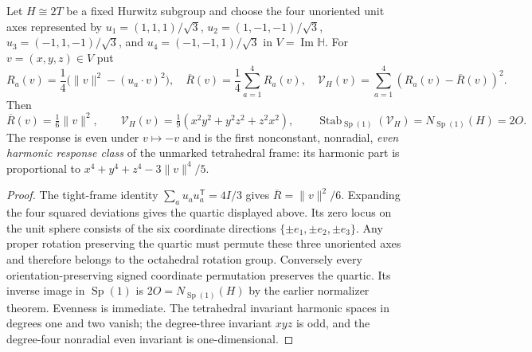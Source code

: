\documentclass[11pt]{article}
\begin{document}
\begin{theorem}
\label{p1b:thm:v18-born-even-octahedral-response}
Let $H\cong2T$ be a fixed Hurwitz subgroup and choose the four
unoriented unit axes represented by
$u_1=(1,1,1)/\sqrt3$, $u_2=(1,-1,-1)/\sqrt3$,
$u_3=(-1,1,-1)/\sqrt3$, and $u_4=(-1,-1,1)/\sqrt3$ in
$V=\operatorname{Im}\mathbb H$.  For $v=(x,y,z)\in V$ put
\[
 R_a(v)=\frac14\bigl(\|v\|^2-(u_a\cdot v)^2\bigr),\quad
 \overline R(v)=\frac14\sum_{a=1}^4R_a(v),\quad
 \mathcal V_H(v)=\sum_{a=1}^4(R_a(v)-\overline R(v))^2.
\]
Then
\[
 \boxed{\overline R(v)=\tfrac16\|v\|^2,\qquad
 \mathcal V_H(v)=\tfrac19(x^2y^2+y^2z^2+z^2x^2),}\qquad
 \boxed{\operatorname{Stab}_{\operatorname{Sp}(1)}(\mathcal V_H)
       =N_{\operatorname{Sp}(1)}(H)=2O.}
\]
The response is even under $v\mapsto-v$ and is the first
nonconstant, nonradial, \emph{even harmonic response class} of the
unmarked tetrahedral frame: its harmonic part is proportional to
$x^4+y^4+z^4-3\|v\|^4/5$.
\end{theorem}
\begin{proof}
The tight-frame identity $\sum_a u_au_a^{\mathsf T}=4I/3$
gives $\overline R=\|v\|^2/6$.  Expanding the four squared deviations
gives the quartic displayed above.  Its zero locus on the unit sphere
consists of the six coordinate directions $\{\pm e_1,\pm e_2,\pm e_3\}$.
Any proper rotation preserving the quartic must permute these three
unoriented axes and therefore belongs to the octahedral rotation group.
Conversely every orientation-preserving signed coordinate permutation
preserves the quartic.  Its inverse image in $\operatorname{Sp}(1)$ is
$2O=N_{\operatorname{Sp}(1)}(H)$ by the earlier normalizer theorem.
Evenness is immediate.  The tetrahedral invariant harmonic spaces in
degrees one and two vanish; the degree-three invariant $xyz$ is odd,
and the degree-four nonradial even invariant is one-dimensional.
\end{proof}
\end{document}
